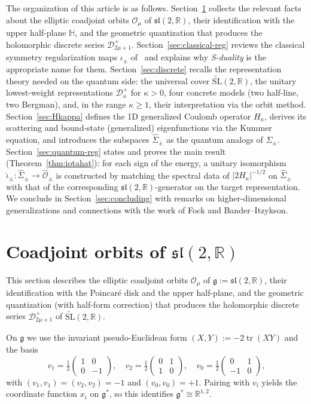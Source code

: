 \documentclass[11pt]{article}
\theoremstyle{plain}
\theoremstyle{definition}
\theoremstyle{remark}
\newcommand{\R}{\mathbb{R}}
\newcommand{\HH}{\mathbb{H}}
\newcommand{\sltwo}{\mathfrak{sl}(2,\R)}
\newcommand{\SLt}{\widetilde{\mathrm{SL}}}
\newcommand{\Sigmah}{\widehat{\Sigma}}
\newcommand{\OO}{\mathcal{O}}
\newcommand{\OOh}{\widehat{\mathcal{O}}}
\newcommand{\D}{\mathcal{D}}
\DeclareMathOperator{\tr}{tr}
\begin{document}
The organization of this article is as follows.
Section~\ref{sec:coadjoint} collects the relevant facts about the
elliptic coadjoint orbits $\OO_{\mu}$ of $\sltwo$, their identification with the
upper half-plane $\HH$, and the geometric quantization that produces the
holomorphic discrete series $\D^{+}_{2\mu+1}$.
Section~\ref{sec:classical-reg} reviews the classical
symmetry regularization maps $\iota_{\pm}$ of~\cite{MMX2025} and explains why
\emph{S-duality} is the appropriate name for them.
Section~\ref{sec:discrete} recalls the representation theory needed on the quantum side: the universal
cover $\SLt(2,\R)$, the unitary lowest-weight representations
$\D^{+}_{\kappa}$ for $\kappa>0$, four concrete models (two half-line, two
Bergman), and, in the range $\kappa\ge 1$, their interpretation via the orbit
method.
Section~\ref{sec:Hkappa} defines the 1D generalized Coulomb operator $H_{\kappa}$,
derives its scattering and bound-state (generalized) eigenfunctions
via the Kummer equation,
and introduces the subspaces $\Sigmah_{\pm}$ as the quantum
analogs of $\Sigma_{\pm}$.
Section~\ref{sec:quantum-reg} states and proves the main result
(Theorem~\ref{thm:iotahat}): for each sign of the energy, a unitary
isomorphism $\hat\iota_{\pm}\colon\Sigmah_{\pm}\to\OOh_{\pm}$ is
constructed by matching the spectral data of $|2H_{\kappa}|^{-1/2}$ on
$\Sigmah_{\pm}$ with that of the corresponding $\sltwo$-generator on the
target representation.
We conclude in Section~\ref{sec:concluding} with remarks on
higher-dimensional generalizations and connections with the work of Fock
and Bander--Itzykson.

\section{Coadjoint orbits of \texorpdfstring{$\sltwo$}{sl(2,R)}}\label{sec:coadjoint}

This section describes the elliptic coadjoint orbits $\OO_{\mu}$ of $\mathfrak{g}:=\sltwo$, their identification with the Poincar\'e
disk and the upper half-plane, and the geometric quantization (with half-form
correction) that produces the holomorphic discrete series
$\D^{+}_{2\mu+1}$ of $\SLt(2,\R)$.


On $\mathfrak g$ we use the invariant pseudo-Euclidean form
$(X,Y):=-2\tr(XY)$ and the basis
\[
  v_{1}=\tfrac12\begin{pmatrix}1&0\\0&-1\end{pmatrix},\quad
  v_{2}=\tfrac12\begin{pmatrix}0&1\\1&0\end{pmatrix},\quad
  v_{0}=\tfrac12\begin{pmatrix}0&1\\-1&0\end{pmatrix},
\]
with $(v_{1},v_{1})=(v_{2},v_{2})=-1$ and $(v_{0},v_{0})=+1$.
Pairing with $v_{i}$ yields the coordinate function $x_{i}$ on $\mathfrak{g}^{*}$,
so this identifies $\mathfrak{g}^{*}\cong\R^{1,2}$.
\end{document}
